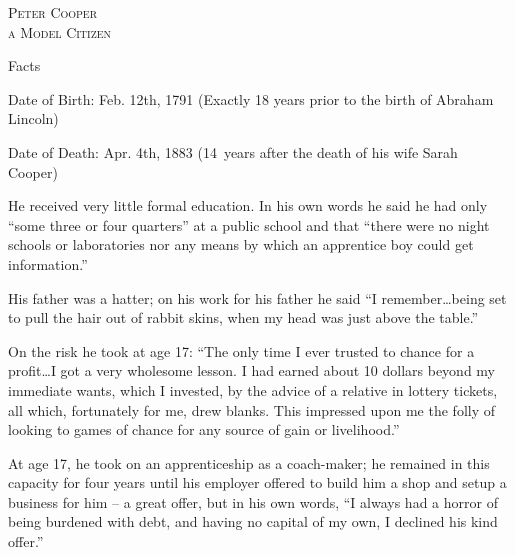 \documentclass{article}
\begin{document}
\centering
{}
\fontsize{0.8in}{0.6in}\selectfont
\scshape 
{} Peter Cooper \\
 a Model Citizen

\vspace{0.05in}

\fontsize{16pt}{16pt}\selectfont
{}
\justify
Facts

\vspace{0.1in}

\begin{minipage}[t]{0.46\linewidth}
\fontsize{10.7pt}{12.7pt}\selectfont
\raggedright
\upshape
\begin{enumList}

\item Date of Birth: Feb. 12th, 1791 (Exactly 18 years prior to the birth of
{\mdseries Abraham Lincoln})

\item Date of Death: Apr. 4th, 1883 (14~years after the death of his wife
{\mdseries Sarah Cooper})

\item He received {\mdseries very little formal education}. In his own words
he said he had only ``some three or four quarters'' at a public school and
that ``there were no night schools or laboratories nor any means by which an
apprentice boy could get information.''

\item His father was a hatter; on his work for his father he said ``I
remember\ldots being set to pull the hair out of rabbit skins, when {\mdseries
my head was just above the table}.''

\item On the risk he took at age 17: ``The only time I ever trusted to chance
for a profit\ldots I got a very wholesome lesson. I had earned about 10
dollars beyond my immediate wants, which I invested, by the advice of a
relative in lottery tickets, all which, fortunately for me, drew blanks. This
impressed upon me the {\mdseries folly of looking to games of chance} for any
source of gain or livelihood.''

\item At age 17, he took on an apprenticeship as a coach-maker; he remained in
this capacity for four years until his employer offered to build him a shop
and setup a business for him -- a great offer, but in his own words, ``I
always had a {\mdseries horror of being burdened with debt}, and having no
capital of my own, {\mdseries I declined his kind offer}.''


\end{enumList}
\end{minipage}
\end{document}
